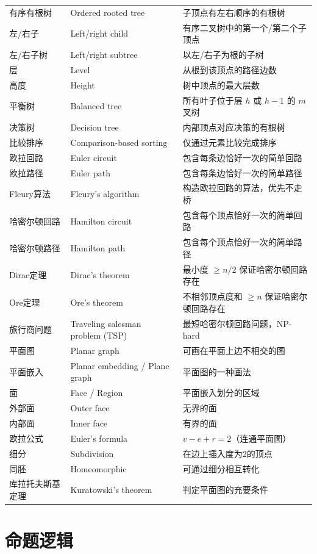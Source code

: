 \documentclass[UTF8,11pt,a4paper]{ctexbook}   %
\theoremstyle{definition}
\begin{document}
\begin{longtable}{|p{4.8cm}|p{4.8cm}|p{4.8cm}|}
有序有根树 & Ordered rooted tree & 子顶点有左右顺序的有根树 \\
左/右子 & Left/right child & 有序二叉树中的第一个/第二个子顶点 \\
左/右子树 & Left/right subtree & 以左/右子为根的子树 \\
层 & Level & 从根到该顶点的路径边数 \\
高度 & Height & 树中顶点的最大层数 \\
平衡树 & Balanced tree & 所有叶子位于层 $h$ 或 $h-1$ 的 $m$ 叉树 \\
决策树 & Decision tree & 内部顶点对应决策的有根树 \\
比较排序 & Comparison-based sorting & 仅通过元素比较完成排序 \\
\hline
欧拉回路 & Euler circuit & 包含每条边恰好一次的简单回路 \\
欧拉路径 & Euler path & 包含每条边恰好一次的简单路径 \\
Fleury算法 & Fleury's algorithm & 构造欧拉回路的算法，优先不走桥 \\
哈密尔顿回路 & Hamilton circuit & 包含每个顶点恰好一次的简单回路 \\
哈密尔顿路径 & Hamilton path & 包含每个顶点恰好一次的简单路径 \\
Dirac定理 & Dirac's theorem & 最小度 $\ge n/2$ 保证哈密尔顿回路存在 \\
Ore定理 & Ore's theorem & 不相邻顶点度和 $\ge n$ 保证哈密尔顿回路存在 \\
旅行商问题 & Traveling salesman problem (TSP) & 最短哈密尔顿回路问题，NP-hard \\
平面图 & Planar graph & 可画在平面上边不相交的图 \\
平面嵌入 & Planar embedding / Plane graph & 平面图的一种画法 \\
面 & Face / Region & 平面嵌入划分的区域 \\
外部面 & Outer face & 无界的面 \\
内部面 & Inner face & 有界的面 \\
欧拉公式 & Euler's formula & $v-e+r=2$（连通平面图） \\
细分 & Subdivision & 在边上插入度为2的顶点 \\
同胚 & Homeomorphic & 可通过细分相互转化 \\
库拉托夫斯基定理 & Kuratowski's theorem & 判定平面图的充要条件 \\
\end{longtable}

\newpage
\chapter{命题逻辑}
\end{document}
